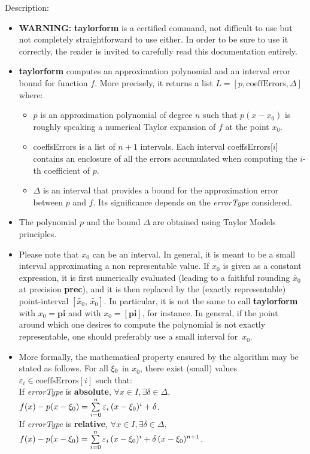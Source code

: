 \noindent Description: \begin{itemize}

\item \textbf{WARNING:} \textbf{taylorform} is a certified command, not difficult to use but not
   completely straightforward to use either. In order to be sure to use it
   correctly, the reader is invited to carefully read this documentation
   entirely.

\item \textbf{taylorform} computes an approximation polynomial and an interval error
   bound for function $f$. 
   More precisely, it returns a list
   $L = \left[p, \textrm{coeffErrors},\Delta \right]$ where:
   \begin{itemize}
   \item $p$ is an approximation polynomial of degree $n$ such that $p(x-x_0)$ is
   roughly speaking a numerical Taylor expansion of $f$ at the point $x_0$.
   \item coeffsErrors is a list of $n+1$ intervals. Each interval coeffsErrors[$i$]
   contains an enclosure of all the errors accumulated when computing the $i$-th
   coefficient of $p$.
   \item $\Delta$ is an interval that provides a bound for the approximation error
   between $p$ and $f$. Its significance depends on the \emph{errorType} considered.
   \end{itemize}

\item The polynomial $p$ and the bound  $\Delta$ are obtained using Taylor Models
   principles.

\item Please note that $x_0$ can be an interval. In general, it is meant to be a
   small interval approximating a non representable value. If $x_0$ is given as a
   constant expression, it is first numerically evaluated (leading to a faithful
   rounding $\tilde{x_0}$ at precision \textbf{prec}), and it is then replaced by the (exactly
   representable) point-interval $[\tilde{x_0},\,\tilde{x_0}]$. In particular, it is not
   the same to call \textbf{taylorform} with $x_0 = \textbf{pi}$ and with $x_0 = [\textbf{pi}]$, for instance.
   In general, if the point around which one desires to compute the polynomial
   is not exactly representable, one should preferably use a small interval
   for~$x_0$.

\item More formally, the mathematical property ensured by the algorithm may be
   stated as follows. For all $\xi_0$ in $x_0$, there exist (small) values
   $\varepsilon_i \in \textrm{coeffsErrors}[i]$ such that:
   \\
   If \emph{errorType} is \textbf{absolute}, $\forall x \in I, \exists \delta \in \Delta,\,$
   $f(x)-p(x-\xi_0) = \sum\limits_{i=0}^{n} \varepsilon_i\, (x-\xi_0)^i + \delta$.
   \\
   If \emph{errorType} is \textbf{relative}, $\forall x \in I, \exists \delta \in \Delta,\,$
   $f(x)-p(x-\xi_0) = \sum\limits_{i=0}^{n} \varepsilon_i\, (x-\xi_0)^i + \delta\,(x-\xi_0)^{n+1}$.


\end{itemize}
